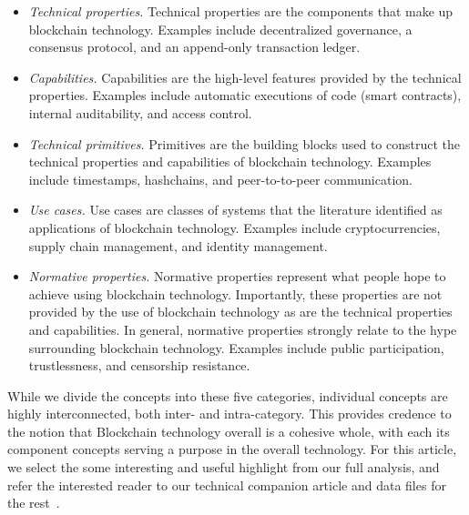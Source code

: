 \begin{itemize}

\item \emph{Technical properties.} Technical properties are the components that make up blockchain technology. Examples include decentralized governance, a consensus protocol, and an append-only transaction ledger.
	
\item \emph{Capabilities.} Capabilities are the high-level features provided by the technical properties. Examples include automatic executions of code (\ie smart contracts), internal auditability, and access control.
	
\item \emph{Technical primitives.} Primitives are the building blocks used to construct the technical properties and capabilities of blockchain technology. Examples include timestamps, hashchains, and peer-to-to-peer communication.
	
\item \emph{Use cases.} Use cases are classes of systems that the literature identified as applications of blockchain technology. Examples include cryptocurrencies, supply chain management, and identity management.
	
\item \emph{Normative properties.} Normative properties represent what people hope to achieve using blockchain technology. Importantly, these properties are not provided by the use of blockchain technology as are the technical properties and capabilities. In general, normative properties strongly relate to the hype surrounding blockchain technology. Examples include public participation, trustlessness, and censorship resistance.

\end{itemize}

While we divide the concepts into these five categories, individual concepts are highly interconnected, both inter- and intra-category. This provides credence to the notion that Blockchain technology overall is a cohesive whole, with each its component concepts serving a purpose in the overall technology. For this article, we select the some interesting and useful highlight from our full analysis, and refer the interested reader to our technical companion article and data files for the rest~\cite{RKYCC19}.


